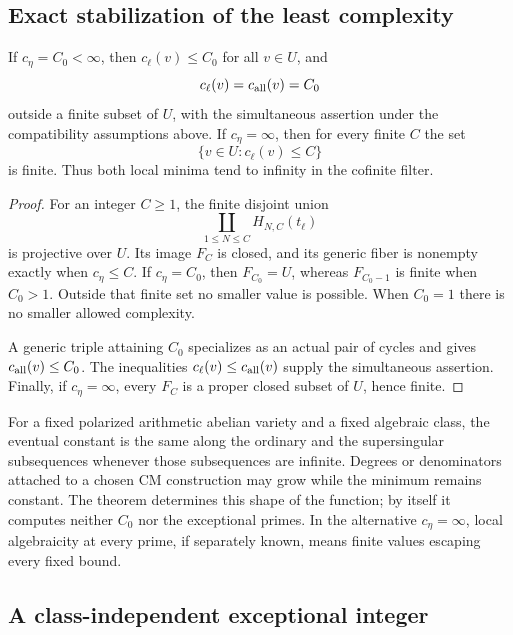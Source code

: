 \subsection{Exact stabilization of the least complexity}

\begin{theorem}
If $c_\eta=C_0<\infty$, then $c_\ell(v)\leq C_0$ for all $v\in U$, and
\[
 c_\ell(v)=c_{\rm all}(v)=C_0
\]
outside a finite subset of $U$, with the simultaneous assertion under the
compatibility assumptions above. If $c_\eta=\infty$, then for every finite
$C$ the set
\[
 \{v\in U:c_\ell(v)\leq C\}
\]
is finite. Thus both local minima tend to infinity in the cofinite filter.
\end{theorem}

\begin{proof}
For an integer $C\geq1$, the finite disjoint union
\[
 \coprod_{1\leq N\leq C}H_{N,C}(t_\ell)
\]
is projective over $U$. Its image $F_C$ is closed, and its generic fiber is
nonempty exactly when $c_\eta\leq C$. If $c_\eta=C_0$, then $F_{C_0}=U$,
whereas $F_{C_0-1}$ is finite when $C_0>1$. Outside that finite set no smaller
value is possible. When $C_0=1$ there is no smaller allowed complexity.

A generic triple attaining $C_0$ specializes as an actual pair of cycles
and gives $c_{\rm all}(v)\leq C_0$. The inequalities
$c_\ell(v)\leq c_{\rm all}(v)$ supply the simultaneous assertion. Finally,
if $c_\eta=\infty$, every $F_C$ is a proper closed subset of $U$, hence finite.
\end{proof}

\begin{remark}
For a fixed polarized arithmetic abelian variety and a fixed algebraic
class, the eventual constant is the same along the ordinary and the
supersingular subsequences whenever those subsequences are infinite.
Degrees or denominators attached to a chosen CM construction may grow
while the minimum remains constant. The theorem determines this shape of
the function; by itself it computes neither $C_0$ nor the exceptional
primes. In the alternative $c_\eta=\infty$, local algebraicity at every
prime, if separately known, means finite values escaping every fixed bound.
\end{remark}

\subsection{A class-independent exceptional integer}

